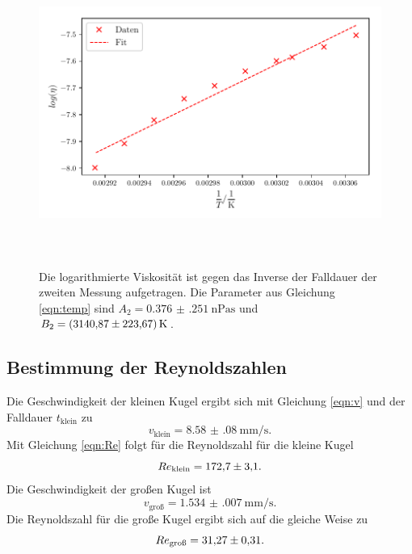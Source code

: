 \begin{figure}
    \centering
    \includegraphics[width=14cm, height=10cm]{build/plot2.pdf}
    \caption{Die logarithmierte Viskosität ist gegen das Inverse
    der Falldauer der zweiten Messung aufgetragen. Die Parameter
    aus Gleichung \eqref{eqn:temp} sind $A_2=\SI{0.376(251)}{\nano\pascal\second}$
    und $B_2=\SI{3140.87 \pm 223.67}{\kelvin}$.}
    \label{fig:plot2}
\end{figure}

\subsection{Bestimmung der Reynoldszahlen}
Die Geschwindigkeit der kleinen Kugel ergibt sich mit Gleichung \eqref{eqn:v}
und der Falldauer $t_\text{klein}$ zu
\begin{equation*}
    v_\text{klein} = \SI{8.58(08)}{\milli\meter\per\second}.
\end{equation*}
Mit Gleichung \eqref{eqn:Re} folgt für die Reynoldszahl für die kleine Kugel
\begin{equation*}
    Re_\text{klein} = \num{172.7 \pm 3.1}.
\end{equation*}
Die Geschwindigkeit der großen Kugel ist
\begin{equation*}
    v_\text{groß} = \SI{1.534(007)}{\milli\meter\per\second}.
\end{equation*}
Die Reynoldszahl für die große Kugel ergibt sich auf die gleiche Weise zu
\begin{equation*}
    Re_\text{groß} = \num{31.27 \pm 0.31}.
\end{equation*}